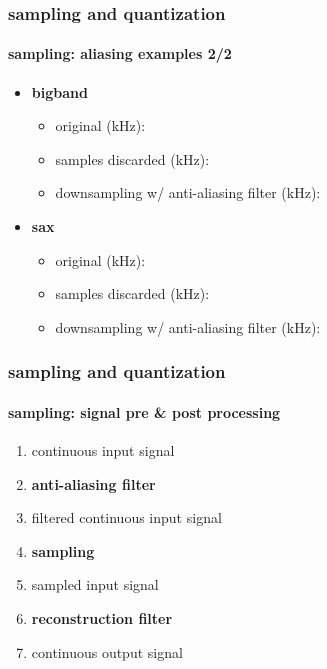 	\begin{frame}\frametitle{sampling and quantization}\framesubtitle{sampling: aliasing examples 2/2}
    \begin{itemize}
        \item \textbf{bigband}
        \begin{itemize}
            \item   original (\unit[48]{kHz}): 
            \item   samples discarded (\unit[6]{kHz}): 
            \item   downsampling  w/ anti-aliasing filter (\unit[6]{kHz}): 
        \end{itemize}
        \pause
        \bigskip
        \item   \textbf{sax}
        \begin{itemize}
            \item   original (\unit[48]{kHz}): 
            \item   samples discarded (\unit[6]{kHz}): 
            \item   downsampling w/ anti-aliasing filter (\unit[6]{kHz}): 
        \end{itemize}
    \end{itemize}
	\end{frame}
	
	\begin{frame}\frametitle{sampling and quantization}\framesubtitle{sampling: signal pre \& post processing}
        \begin{enumerate}
            \item[]   continuous input signal
            \pause
            \item   \textbf{anti-aliasing filter}
            \pause
            \item[] filtered continuous input signal
            \pause
            \item   \textbf{sampling}
            \pause
            \item[] sampled input signal
            \pause
            \item   \textbf{reconstruction filter}
            \pause
            \item[] continuous output signal
        \end{enumerate}
	\end{frame}
